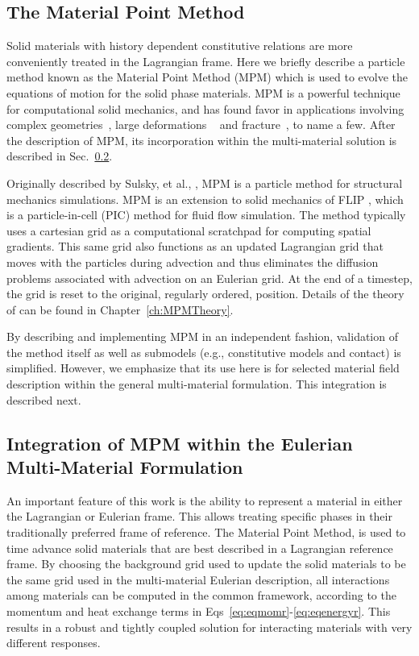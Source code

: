 \subsection{The Material Point Method}\label{sec:mpm}

Solid materials with history dependent constitutive relations are more 
conveniently treated in the Lagrangian frame.  Here we briefly describe a 
particle method known as the Material Point Method (MPM) which is used to 
evolve the equations of motion for the solid phase materials.  MPM is a 
powerful technique for computational solid mechanics, and has found favor 
in applications involving complex geometries~\cite{Guilkey2006}, large 
deformations ~\cite{Brydon2005} and fracture~\cite{Guo2004}, to name 
a few.  After the description of MPM, its incorporation 
within the multi-material solution is described in 
Sec.~\ref{sec:coupling}.

Originally described by Sulsky, et al., \cite{Sulsky1994,Sulsky1995}, 
MPM is a particle method for structural mechanics simulations.  MPM is an 
extension to solid mechanics of FLIP \cite{brackbill-ruppel86}, which is a 
particle-in-cell (PIC) method for fluid flow simulation.  The method typically
uses a cartesian grid as a computational scratchpad for computing
spatial gradients.  This same grid also functions as an updated Lagrangian grid
that moves with the particles during advection and thus eliminates the
diffusion problems associated with advection on an Eulerian grid.  At the end
of a timestep, the grid is reset to the original, regularly ordered, position.
Details of the theory of \MPM can be found in Chapter~\ref{ch:MPMTheory}.

By describing and implementing MPM in an independent fashion, validation of 
the method itself as well as submodels (e.g., constitutive models and contact)
is simplified.  However, we emphasize that its use here is for selected 
material field description within the general multi-material formulation.  This 
integration is described next.

\subsection{Integration of MPM within the Eulerian Multi-Material 
            Formulation}\label{sec:coupling}

An important feature of this work is the ability to represent a material in 
either the Lagrangian or Eulerian frame.  This allows treating specific phases 
in their traditionally preferred frame of reference.
The Material Point Method, is used to time 
advance solid materials that are best described in a Lagrangian reference frame.
By choosing the background grid used to update the solid materials to
be the same grid used in the multi-material Eulerian description,
all interactions among materials can be computed in the common
framework, according to the momentum and heat exchange terms in 
Eqs~\ref{eq:eqmomr}-\ref{eq:eqenergyr}.  This results in a robust and tightly 
coupled solution for interacting materials with very different responses.

